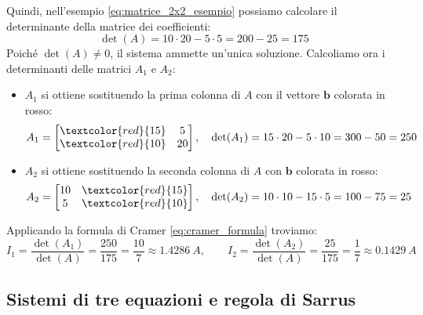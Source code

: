 Quindi, nell'esempio \ref{eq:matrice_2x2_esempio} possiamo calcolare il determinante della matrice dei coefficienti:
\begin{equation}
\det(A) = 10 \cdot 20 - 5 \cdot 5 = 200 - 25 = 175
\label{eq:detA_2x2}
\end{equation}
Poiché \(\det(A) \neq 0\), il sistema ammette un'unica soluzione. Calcoliamo ora i determinanti delle matrici \(A_1\) e \(A_2\):
\begin{itemize}
\item \(A_1\) si ottiene sostituendo la prima colonna di \(A\) con il vettore \(\mathbf{b}\) colorata in rosso:
\begin{equation}
A_1 = \begin{bmatrix}
\textcolor{red}{15} & 5 \\
\textcolor{red}{10} & 20
\end{bmatrix},\quad
\det(A_1) = 15 \cdot 20 - 5 \cdot 10 = 300 - 50 = 250
\label{eq:detA1_2x2}
\end{equation}
\item \(A_2\) si ottiene sostituendo la seconda colonna di \(A\) con \(\mathbf{b}\) colorata in rosso:
\begin{equation}
A_2 = \begin{bmatrix}
10 & \textcolor{red}{15} \\
5  & \textcolor{red}{10}
\end{bmatrix},\quad
\det(A_2) = 10 \cdot 10 - 15 \cdot 5 = 100 - 75 = 25
\label{eq:detA2_2x2}
\end{equation}
\end{itemize}
Applicando la formula di Cramer \eqref{eq:cramer_formula} troviamo:
\begin{equation}
I_1 = \frac{\det(A_1)}{\det(A)} = \frac{250}{175} = \frac{10}{7} \approx \SI{1.4286}{A},\qquad
I_2 = \frac{\det(A_2)}{\det(A)} = \frac{25}{175} = \frac{1}{7} \approx \SI{0.1429}{A}
\label{eq:soluzione_2x2}
\end{equation}

\subsection{Sistemi di tre equazioni e regola di Sarrus}

